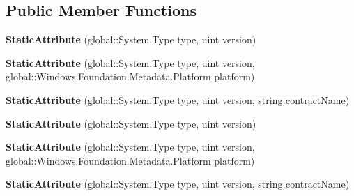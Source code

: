 \subsection*{Public Member Functions}
\begin{DoxyCompactItemize}
\item 
\mbox{\label{class_windows_1_1_foundation_1_1_metadata_1_1_static_attribute_afddbe5fa0518878f972aa5b00c32fd30}} 
{\bfseries Static\+Attribute} (global\+::\+System.\+Type type, uint version)
\item 
\mbox{\label{class_windows_1_1_foundation_1_1_metadata_1_1_static_attribute_a8c73e44abb883e812d4447c06e986be7}} 
{\bfseries Static\+Attribute} (global\+::\+System.\+Type type, uint version, global\+::\+Windows.\+Foundation.\+Metadata.\+Platform platform)
\item 
\mbox{\label{class_windows_1_1_foundation_1_1_metadata_1_1_static_attribute_ab58963b833fb6f70c5f34aedfc65c4df}} 
{\bfseries Static\+Attribute} (global\+::\+System.\+Type type, uint version, string contract\+Name)
\item 
\mbox{\label{class_windows_1_1_foundation_1_1_metadata_1_1_static_attribute_afddbe5fa0518878f972aa5b00c32fd30}} 
{\bfseries Static\+Attribute} (global\+::\+System.\+Type type, uint version)
\item 
\mbox{\label{class_windows_1_1_foundation_1_1_metadata_1_1_static_attribute_a8c73e44abb883e812d4447c06e986be7}} 
{\bfseries Static\+Attribute} (global\+::\+System.\+Type type, uint version, global\+::\+Windows.\+Foundation.\+Metadata.\+Platform platform)
\item 
\mbox{\label{class_windows_1_1_foundation_1_1_metadata_1_1_static_attribute_ab58963b833fb6f70c5f34aedfc65c4df}} 
{\bfseries Static\+Attribute} (global\+::\+System.\+Type type, uint version, string contract\+Name)
\item 
\mbox{\label{class_windows_1_1_foundation_1_1_metadata_1_1_static_attribute_afddbe5fa0518878f972aa5b00c32fd30}} 

\end{DoxyCompactItemize}
